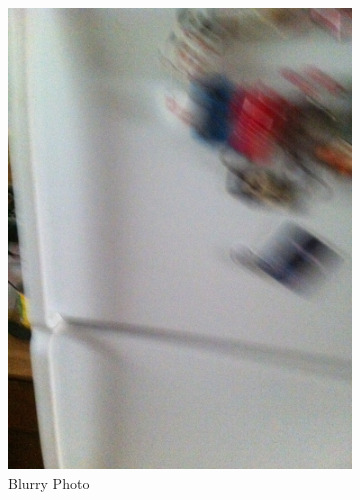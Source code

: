\documentclass[sigconf]{acmart}
\begin{document}
\begin{figure}[hbp]
        \centering
        \begin{subfigure}[b]{0.3\columnwidth}
                \includegraphics[scale=0.15]{images/blurry.jpg}  
                \caption{Blurry Photo}
                \label{fig:blur}
        \end{subfigure}%
        ~ 
        \begin{subfigure}[b]{0.3\columnwidth}

\end{subfigure}
\end{figure}
\end{document}
